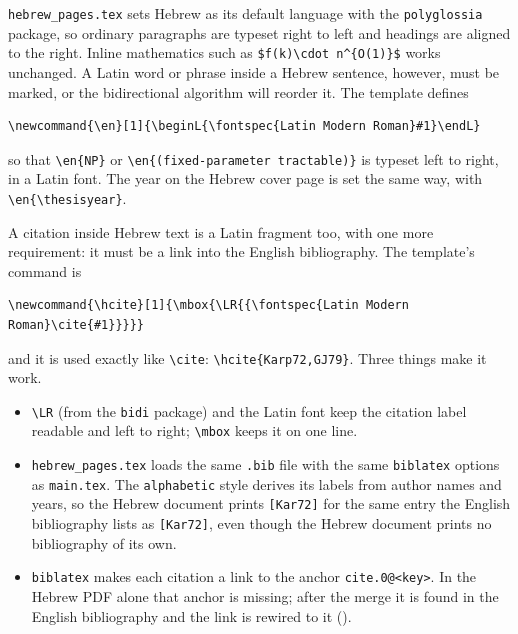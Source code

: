 

\texttt{hebrew\_pages.tex} sets Hebrew as its default language with the \texttt{polyglossia} package, so ordinary paragraphs are typeset right to left and headings are aligned to the right.
Inline mathematics such as \verb|$f(k)\cdot n^{O(1)}$| works unchanged.
A Latin word or phrase inside a Hebrew sentence, however, must be marked, or the bidirectional algorithm will reorder it. The template defines

\begin{lstlisting}
\newcommand{\en}[1]{\beginL{\fontspec{Latin Modern Roman}#1}\endL}
\end{lstlisting}

so that \verb|\en{NP}| or \verb|\en{(fixed-parameter tractable)}| is typeset left to right, in a Latin font.
The year on the Hebrew cover page is set the same way, with \verb|\en{\thesisyear}|.

\label{sec:hcite}

A citation inside Hebrew text is a Latin fragment too, with one more requirement: it must be a link into the English bibliography.
The template's command is

\begin{lstlisting}
\newcommand{\hcite}[1]{\mbox{\LR{{\fontspec{Latin Modern Roman}\cite{#1}}}}}
\end{lstlisting}

and it is used exactly like \verb|\cite|: \verb|\hcite{Karp72,GJ79}|.
Three things make it work.

\begin{itemize}
    \item \verb|\LR| (from the \texttt{bidi} package) and the Latin font keep the citation label readable and left to right; \verb|\mbox| keeps it on one line.
    \item \texttt{hebrew\_pages.tex} loads the same \texttt{.bib} file with the same \texttt{biblatex} options as \texttt{main.tex}. The \texttt{alphabetic} style derives its labels from author names and years, so the Hebrew document prints \texttt{[Kar72]} for the same entry the English bibliography lists as \texttt{[Kar72]}, even though the Hebrew document prints no bibliography of its own.
    \item \texttt{biblatex} makes each citation a link to the anchor \texttt{cite.0@<key>}. In the Hebrew PDF alone that anchor is missing; after the merge it is found in the English bibliography and the link is rewired to it ().
\end{itemize}

